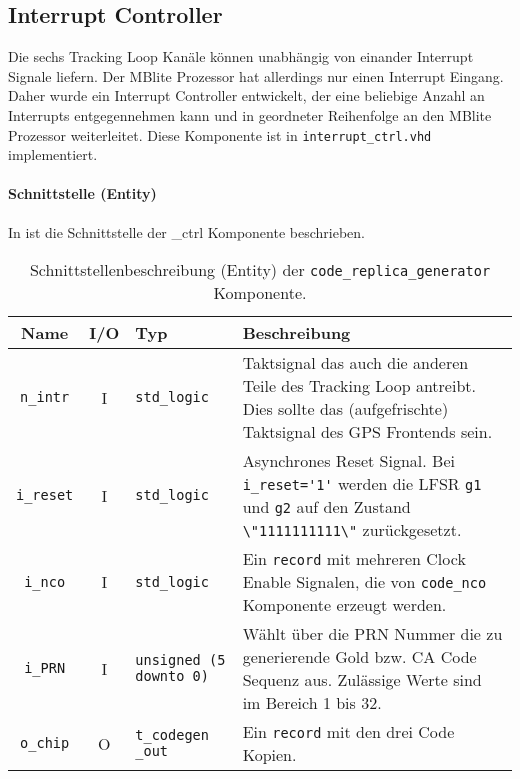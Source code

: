 \subsection{Interrupt Controller}
Die sechs Tracking Loop Kanäle können unabhängig von einander Interrupt Signale liefern. Der MBlite Prozessor hat allerdings nur einen Interrupt Eingang. Daher wurde ein Interrupt Controller entwickelt, der eine beliebige Anzahl an Interrupts entgegennehmen kann und in geordneter Reihenfolge an den MBlite Prozessor weiterleitet. Diese Komponente ist in \lstinline$interrupt_ctrl.vhd$ implementiert. 


\paragraph{Schnittstelle (Entity)}
In  ist die Schnittstelle der \interrupt_ctrl Komponente beschrieben.



\begin{table}[htbp]
    \ttabbox
    {
        \caption[Code Replika Generator Schnittstelle]{Schnittstellenbeschreibung (Entity) der \lstinline$code_replica_generator$ Komponente.}
        \label{TabIRQCtrl_Entity}
    }
    {
    \begin{tabular}{c c  p{2cm} p{6cm}}
        \toprule
        Name                    & I/O  & Typ                               & Beschreibung \\
        \midrule
        \lstinline$n_intr$       & I         & \lstinline$std_logic$             & Taktsignal das auch die anderen Teile des Tracking Loop antreibt. Dies sollte das (aufgefrischte) Taktsignal des GPS Frontends sein.\\
        \lstinline$i_reset$     & I         & \lstinline$std_logic$             & Asynchrones Reset Signal. Bei \lstinline$i_reset='1'$ werden die LFSR \lstinline$g1$ und \lstinline$g2$ auf den Zustand \lstinline$\"1111111111\"$ zurückgesetzt.\\
        \lstinline$i_nco$    & I         & \lstinline$std_logic$             & Ein \lstinline$record$ mit mehreren Clock Enable Signalen, die von \lstinline$code_nco$ Komponente erzeugt werden.\\
        \lstinline$i_PRN$       & I         & \lstinline$unsigned (5 downto 0)$ & Wählt über die PRN Nummer die zu generierende Gold bzw. \gls{CA} Code Sequenz aus. Zulässige Werte sind im Bereich 1 bis 32.\\
        \lstinline$o_chip$      & O         & \lstinline$t_codegen _out$             & Ein \lstinline$record$ mit den drei Code Kopien.\\
        \bottomrule
    \end{tabular}
}
\end{table}

